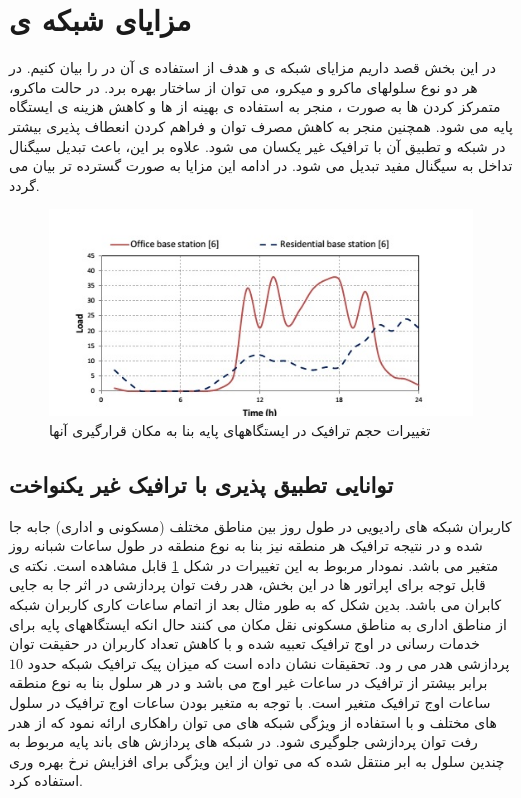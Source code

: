 \section{مزایای شبکه ی }

در این بخش قصد داریم مزایای شبکه ی  و هدف از استفاده ی آن در  را بیان کنیم.
\newline
در هر دو نوع سلولهای ماکرو و میکرو، می توان از ساختار  بهره برد. در حالت ماکرو، متمرکز کردن  ها به صورت ، منجر به استفاده ی بهینه از  ها و کاهش هزینه ی ایستگاه پایه  می شود. همچنین منجر به کاهش مصرف توان و فراهم کردن انعطاف پذیری بیشتر در شبکه و تطبیق آن با ترافیک غیر یکسان می شود. علاوه بر این، باعث تبدیل سیگنال تداخل به سیگنال مفید تبدیل می شود. در ادامه این مزایا به صورت گسترده تر بیان می گردد. \cite{checko2015cloud, namba2012colony}
\begin{figure}
  \centering
    \includegraphics[width=\textwidth]{c4}
  \caption{تغییرات حجم ترافیک در ایستگاههای پایه بنا به
مکان قرارگیری آنها \cite{checko2015cloud}}
  \label{fig:c4}
\end{figure}
\subsection{توانایی تطبیق پذیری با ترافیک غیر
یکنواخت }
کاربران شبکه های رادیویی در طول روز بین مناطق مختلف
(مسکونی و اداری) جابه جا شده و در نتیجه ترافیک هر
منطقه نیز بنا به نوع منطقه در طول ساعات شبانه روز متغیر
می باشد.
نمودار مربوط به این تغییرات در شکل \ref{fig:c4} قابل
مشاهده است. نکته ی قابل توجه برای اپراتور ها در این
بخش، هدر رفت توان پردازشی در اثر جا به جایی کابران می
باشد. بدین شکل که به طور مثال بعد از اتمام ساعات کاری
کاربران شبکه از مناطق اداری به مناطق مسکونی نقل مکان
می کنند حال انکه ایستگاههای پایه برای خدمات رسانی
در اوج ترافیک تعبیه شده و با کاهش تعداد کاربران در
حقیقت توان پردازشی هدر می ر ود. تحقیقات نشان داده
است که میزان پیک ترافیک شبکه حدود  $10$ برابر بیشتر
از ترافیک در ساعات غیر اوج می باشد و در هر سلول بنا
به نوع منطقه ساعات اوج ترافیک متغیر است. با توجه به
متغیر بودن ساعات اوج ترافیک در سلول های مختلف و
با استفاده از ویژگی شبکه های  می توان راهکاری
ارائه نمود که از هدر رفت توان پردازشی جلوگیری شود.
در شبکه های  پردازش های باند پایه مربوط به
چندین سلول به ابر منتقل شده که می توان از این ویژگی
برای افزایش نرخ بهره وری استفاده کرد.  \cite{checko2015cloud, namba2012colony} 
